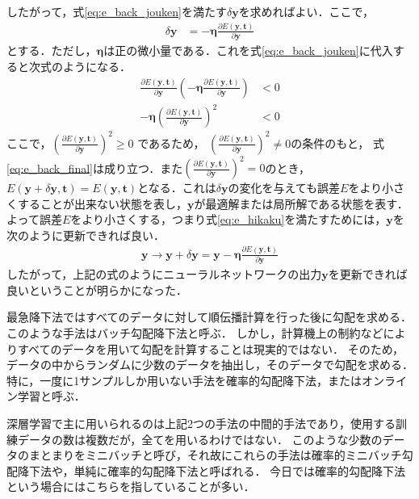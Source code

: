     したがって，式\ref{eq:e_back_jouken}を満たす$\delta \bm{y}$を求めればよい．ここで，
    \begin{align}
      \delta \bm{y} &= -\bm{\eta} \frac{\partial E(\bm{y}, \bm{t})}{\partial \bm{y}}
    \end{align}
    とする．ただし，$\bm{\eta}$は正の微小量である．これを式\ref{eq:e_back_jouken}に代入すると次式のようになる．
    \begin{align}
      \frac{\partial E(\bm{y}, \bm{t})}{\partial \bm{y}} \left( - \bm{\eta} \frac{\partial E(\bm{y}, \bm{t})}{\partial \bm{y}} \right) &< 0  \nonumber \\
      - \bm{\eta} \left( \frac{\partial E(\bm{y}, \bm{t})}{\partial \bm{y}} \right)^{2} &< 0 
      \label{eq:e_back_final}
    \end{align}
    ここで，$\left( \frac{\partial E(\bm{y}, \bm{t})}{\partial \bm{y}} \right)^{2} \geq 0$ であるため，
    $\left( \frac{\partial E(\bm{y}, \bm{t})}{\partial \bm{y}} \right)^{2} \neq 0$の条件のもと，
    式\ref{eq:e_back_final}は成り立つ．また$\left( \frac{\partial E(\bm{y}, \bm{t})}{\partial \bm{y}} \right)^{2} = 0$のとき，$  E (\bm{y} + \delta \bm{y}, \bm{t}) = E(\bm{y}, \bm{t}) $となる．これは$\delta \bm{y}$の変化を与えても誤差$E$をより小さくすることが出来ない状態を表し，$\bm{y}$が最適解または局所解である状態を表す．
    よって誤差$E$をより小さくする，つまり式\ref{eq:e_hikaku}を満たすためには，$\bm{y}$を次のように更新できれば良い．
    \begin{align}
      \bm{y} \to \bm{y} + \delta \bm{y} = \bm{y} - \bm{\eta} \frac{\partial E(\bm{y}, \bm{t})}{\partial \bm{y}}
      \label{eq:e_y_result}
    \end{align}
    したがって，上記の式のようにニューラルネットワークの出力$\bm{y}$を更新できれば良いということが明らかになった．
    
    最急降下法ではすべてのデータに対して順伝播計算を行った後に勾配を求める．
    このような手法はバッチ勾配降下法と呼ぶ．
    しかし，計算機上の制約などによりすべてのデータを用いて勾配を計算することは現実的ではない．
    そのため，データの中からランダムに少数のデータを抽出し，そのデータで勾配を求める．
    特に，一度に1サンプルしか用いない手法を確率的勾配降下法，またはオンライン学習と呼ぶ．
    
    深層学習で主に用いられるのは上記2つの手法の中間的手法であり，使用する訓練データの数は複数だが，全てを用いるわけではない．
    このような少数のデータのまとまりをミニバッチと呼び，それ故にこれらの手法は確率的ミニバッチ勾配降下法や，単純に確率的勾配降下法と呼ばれる．
    今日では確率的勾配降下法という場合にはこちらを指していることが多い．
    
